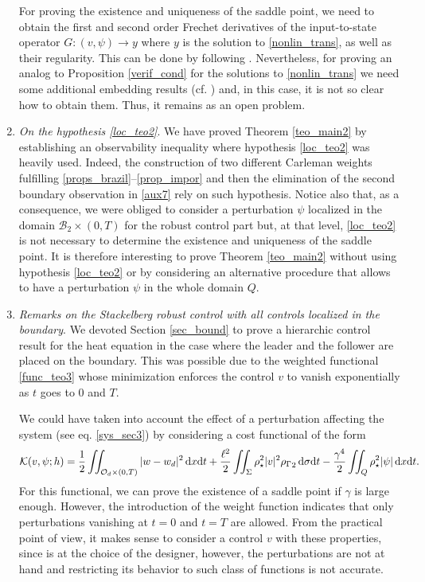 \documentclass{aims}
\theoremstyle{definition}
\def\csbd{\rho_{\Gamma}}
\def\dx{\,\textnormal{d}x}
\def\dt{\textnormal{d}t}
\def\d{\,\textnormal{d}}
\begin{document}
\begin{enumerate}
For proving the existence and uniqueness of the saddle point, we need to obtain the first and second order Frechet derivatives of the input-to-state operator $G:(v,\psi)\to y$ where $y$ is the solution to \eqref{nonlin_trans}, {as well as their regularity.} This can be done by following \cite{vhs_deT_rob}. Nevertheless, for proving an analog to Proposition \ref{verif_cond} for the solutions to \eqref{nonlin_trans} we need some additional embedding results (cf. \cite[Proof of Prop. 2]{vhs_deT_rob}) and, in this case, it is not so clear how to obtain them. Thus, it remains as an open problem.
%
\item \textit{On the hypothesis \eqref{loc_teo2}}. We have proved Theorem \ref{teo_main2} by establishing an observability inequality where hypothesis \eqref{loc_teo2} was heavily used. Indeed, the construction of two different Carleman weights fulfilling \eqref{props_brazil}--\eqref{prop_impor} and then the elimination of the second boundary observation in \eqref{aux7} rely on such hypothesis. Notice also that, as a consequence, we were obliged to consider a perturbation $\psi$ localized in the domain $\mathcal B_2\times(0,T)$ for the robust control part but, at that level, \eqref{loc_teo2} is not necessary to determine the existence and uniqueness of the saddle point. It is therefore interesting to prove Theorem \ref{teo_main2} without using hypothesis \eqref{loc_teo2} or by considering an alternative procedure that allows to have a perturbation $\psi$ in the whole domain $Q$. 

\item \textit{Remarks on the Stackelberg robust control with all controls localized in the boundary}. We devoted Section \ref{sec_bound} to prove a hierarchic control result for the heat equation in the case where the leader and the follower are placed on the boundary. This was possible due to the weighted functional \eqref{func_teo3} whose minimization enforces the control $v$ to vanish exponentially as $t$ goes to $0$ and $T$. 

We could have taken into account the effect of a perturbation affecting the system (see eq. \eqref{sys_sec3}) by considering a cost functional of the form
%
\begin{equation*}
\mathcal K(v,\psi;h)=\frac{1}{2}\iint_{\mathcal O_d\times(0,T)}|w-w_d|^2\dx\dt+\frac{\ell^2}{2}\iint_{\Sigma}\rho_\star^2|v|^2{\csbd}_2\d\sigma\dt-\frac{\gamma^4}{2}\iint_{Q}\rho_\star^2|\psi|\dx\dt.
\end{equation*}
%
For this functional, we can prove the existence of a saddle point if $\gamma$ is large enough. However, the introduction of the weight function indicates that only perturbations vanishing at $t=0$ and $t=T$ are allowed. From the practical point of view, it makes sense to consider a control $v$ with these properties, since is at the choice of the designer, however, the perturbations are not at hand and restricting its behavior to such class of functions is not accurate.


\end{enumerate}
\end{document}
